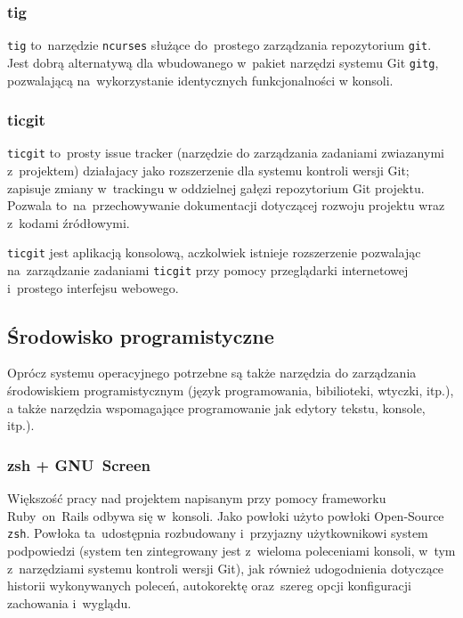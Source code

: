 \subsubsection{tig}

\texttt{tig} to~narzędzie \texttt{ncurses} służące do~prostego zarządzania repozytorium \texttt{git}. Jest dobrą alternatywą dla wbudowanego w~pakiet narzędzi systemu Git \texttt{gitg}, pozwalającą na~wykorzystanie identycznych funkcjonalności w konsoli.

\subsubsection{ticgit}

\texttt{ticgit}\cite{ticgit} to~prosty issue tracker (narzędzie do zarządzania zadaniami zwiazanymi z~projektem) działajacy jako rozszerzenie dla systemu kontroli wersji Git; zapisuje zmiany w~trackingu w oddzielnej gałęzi repozytorium Git projektu. Pozwala to~na~przechowywanie dokumentacji dotyczącej rozwoju projektu wraz z~kodami źródłowymi.

\texttt{ticgit} jest aplikacją konsolową, aczkolwiek istnieje rozszerzenie pozwalając na~zarządzanie zadaniami \texttt{ticgit} przy pomocy przeglądarki internetowej i~prostego interfejsu webowego\cite{ticgitweb}.

\subsection{Środowisko programistyczne}

Oprócz systemu operacyjnego potrzebne są także narzędzia do zarządzania środowiskiem programistycznym (język programowania, bibilioteki, wtyczki, itp.), a także narzędzia wspomagające programowanie jak edytory tekstu, konsole, itp.).

\subsubsection{zsh + GNU~Screen}

Większość pracy nad projektem napisanym przy pomocy frameworku Ruby~on~Rails odbywa się w~konsoli. Jako powłoki użyto powłoki Open-Source \texttt{zsh}\cite{zsh}. Powłoka ta~udostępnia rozbudowany i~przyjazny użytkownikowi system podpowiedzi (system ten zintegrowany jest z~wieloma poleceniami konsoli, w~tym z~narzędziami systemu kontroli wersji Git), jak również udogodnienia dotyczące historii wykonywanych poleceń, autokorektę oraz~szereg opcji konfiguracji zachowania i~wyglądu.


